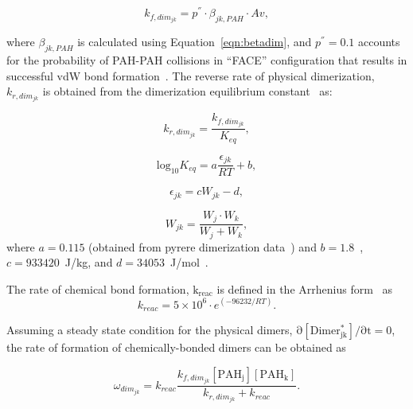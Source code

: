 \begin{equation}
	k_{f,dim_{jk}}=
	p^{''}\cdot\beta_{jk,PAH}\cdot Av
	\label{eqn:kfphydim_reacdim},
\end{equation}

\noindent where $\beta_{jk,PAH}$ is calculated using Equation~\eqref{eqn:betadim}, and ${p^{''}}=0.1$ accounts for the probability of PAH-PAH collisions in “FACE” configuration that results in successful vdW bond formation~\citep{miller1984intermolecular}. The reverse rate of physical dimerization, ${k_{r,dim_{jk}}}$ is obtained from the dimerization equilibrium constant~\citep{miller1991kinetics} as:

\begin{equation}
	k_{r,dim_{jk}} = \frac{k_{f,dim_{jk}}}{K_{eq}} 
	\label{eqn:krphydim_reacdim},
\end{equation}

\begin{equation}
	\mathrm{log}_{10}K_{eq}=
	a\frac{\epsilon_{jk}}{RT}+b
	\label{eqn:keq_reacdim},
\end{equation}

\begin{equation}
	\epsilon_{jk} = cW_{jk} -d
	\label{eqn:epsilon_reacdim},
\end{equation}

\begin{equation}
	W_{jk} = \frac{W_j\cdot W_k}{W_j+W_k}
	\label{eqn:Wjk_reacdim},
\end{equation}
\noindent where $a=0.115$ (obtained from pyrere dimerization data~\citep{sabbah2010exploring}) and $b=1.8$~\citep{kholghy2018reactive}, $c=933420$~J/kg, and $d=34053$~J/mol~\cite{kholghy2018reactive}. 

The rate of chemical bond formation, $\mathrm{k_{reac}}$ is defined in the Arrhenius form~\cite{naseri2022simulating} as
\begin{equation}
	k_{reac} = 5\times10^6\cdot e^{(-96232/RT)}
	\label{eqn:kc_reacdim}.
\end{equation}

Assuming a steady state condition for the physical dimers, $\mathrm{\partial [Dimer^*_{jk}]/\partial t=0}$, the rate of formation of chemically-bonded dimers can be obtained as

\begin{equation}
	\omega_{dim_{jk}} = k_{reac}\frac{k_{f,dim_{jk}}[\mathrm{PAH_j}][\mathrm{PAH_k}]}
	{k_{r,dim_{jk}}+k_{reac}}
	\label{eqn:chemdimer_reacdim}.
\end{equation}


